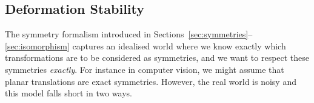




\subsection{Deformation Stability}
\label{sec:geom_stab}
%
%
The symmetry formalism introduced in Sections~\ref{sec:symmetries}--\ref{sec:isomorphism} captures an idealised world where we know exactly which transformations are to be considered as symmetries, and we want to respect these symmetries {\em exactly}. 
For instance in computer vision, we might assume that planar translations are exact symmetries.
However, the real world is noisy and this model falls short in two ways. %

